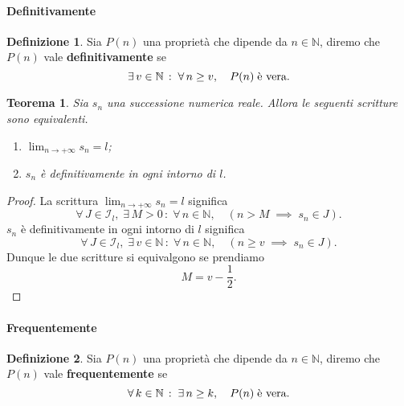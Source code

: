 \documentclass{article}
\theoremstyle{plain}
\newtheorem{thm}{Teorema}[section]
\theoremstyle{definition}
\newtheorem{defn}{Definizione}[section]
\theoremstyle{remark}
\begin{document}
\vspace{10pt}

\paragraph{Definitivamente}
\begin{bxthm}
\begin{defn}
    Sia $P(n)$ una proprietà che dipende da $n\in\mathbb{N}$, diremo che $P(n)$ vale \textbf{definitivamente} se
    \[\exists\,v\in\mathbb{N}\,:\;\forall\,n\geq v,\quad P(n)\;\textup{è vera}.\]
\end{defn}
\end{bxthm}

\vspace{10pt}

\begin{bxthm}
\begin{thm}
    Sia $s_n$ una successione numerica reale. Allora le seguenti scritture sono equivalenti.
    \begin{enumerate}
        \item $\lim_{n\to+\infty}s_n=l$;
        \item $s_n$ è definitivamente in ogni intorno di $l$.
    \end{enumerate}
\end{thm}
\end{bxthm}
\begin{proof}
    La scrittura $\lim_{n\to+\infty}s_n=l$ significa
    \[\forall\, J\in \mathcal{I}_l,\;\exists\, M>0\,:\;\forall\, n\in\mathbb{N},\quad(n>M\;\implies\; s_n\in J).\]
    $s_n$ è definitivamente in ogni intorno di $l$ significa 
    \[\forall\, J\in \mathcal{I}_l,\;\exists\, v\in\mathbb{N}\,:\;\forall\, n\in\mathbb{N},\quad (n\geq v\;\implies\; s_n\in J).\]
    Dunque le due scritture si equivalgono se prendiamo \[M=v-\dfrac{1}{2}.\]
\end{proof}

\vspace{10pt}

\paragraph{Frequentemente}
\begin{bxthm}
\begin{defn}
    Sia $P(n)$ una proprietà che dipende da $n\in\mathbb{N}$, diremo che $P(n)$ vale \textbf{frequentemente} se
    \[\forall\,k\in\mathbb{N}\,:\;\exists\,n\geq k,\quad P(n)\;\textup{è vera}.\]
\end{defn}
\end{bxthm}
\end{document}
